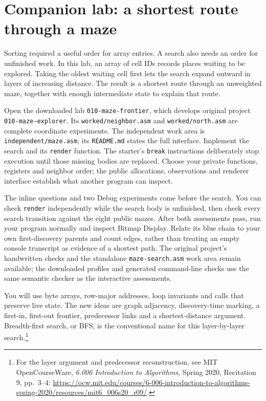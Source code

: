 \section{Companion lab: a shortest route through a maze}
\label{revision-lab:maze}

Sorting required a useful order for array entries. A search also needs an order
for unfinished work. In this lab, an array of cell IDs records places waiting to
be explored. Taking the oldest waiting cell first lets the search expand outward
in layers of increasing distance. The result is a shortest route through an
unweighted maze, together with enough intermediate state to explain that route.

Open the downloaded lab \texttt{010-maze-frontier}, which develops original
project \texttt{010-maze-explorer}. Its \texttt{worked/neighbor.asm} and
\texttt{worked/north.asm} are complete coordinate experiments. The independent
work area is \texttt{independent/maze.asm}; its \texttt{README.md} states the full
interface. Implement the search and its \texttt{render} function. The starter's
\texttt{break} instructions deliberately stop execution until those missing bodies
are replaced. Choose your private functions, registers and neighbor order; the
public allocations, observations and renderer interface establish what another
program can inspect.

The inline questions and two Debug experiments come before the search. You can
check \texttt{render} independently while the search body is unfinished, then check
every search transition against the eight public mazes. After both assessments
pass, run your program normally and inspect Bitmap Display. Relate its blue chain
to your own first-discovery parents and count edges, rather than treating an empty
console transcript as evidence of a shortest path. The original project's
handwritten checks and the standalone \texttt{maze-search.asm} work area remain
available; the downloaded profiles and generated command-line checks use the same
semantic checker as the interactive assessments.

You will use byte arrays, row-major addresses, loop invariants and calls that
preserve live state. The new ideas are graph adjacency, discovery-time marking,
a first-in, first-out frontier, predecessor links and a shortest-distance argument.
Breadth-first search, or BFS, is the conventional name for this layer-by-layer
search.\footnote{For the layer argument and predecessor reconstruction, see MIT
  OpenCourseWare, \emph{6.006 Introduction to Algorithms}, Spring 2020, Recitation 9,
  pp.~3--4: \url{https://ocw.mit.edu/courses/6-006-introduction-to-algorithms-spring-2020/resources/mit6_006s20_r09/}.}

